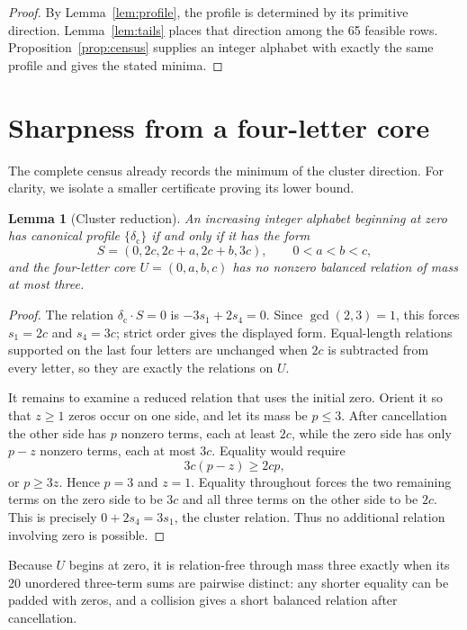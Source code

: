 \documentclass[11pt]{article}
\newtheorem{lemma}[theorem]{Lemma}
\theoremstyle{definition}
\begin{document}
\begin{proof}
By Lemma~\ref{lem:profile}, the profile is determined by its primitive
direction.  Lemma~\ref{lem:tails} places that direction among the 65 feasible
rows.  Proposition~\ref{prop:census} supplies an integer alphabet with
exactly the same profile and gives the stated minima.
\end{proof}

\section{Sharpness from a four-letter core}

The complete census already records the minimum of the cluster direction.
For clarity, we isolate a smaller certificate proving its lower bound.

\begin{lemma}[Cluster reduction]\label{lem:cluster}
An increasing integer alphabet beginning at zero has canonical profile
$\{\delta_{\mathrm c}\}$ if and only if it has the form
\[
 S=(0,2c,2c+a,2c+b,3c),\qquad 0<a<b<c,
\]
and the four-letter core $U=(0,a,b,c)$ has no nonzero balanced relation of
mass at most three.
\end{lemma}

\begin{proof}
The relation $\delta_{\mathrm c}\cdot S=0$ is
$-3s_1+2s_4=0$.  Since $\gcd(2,3)=1$, this forces $s_1=2c$ and $s_4=3c$;
strict order gives the displayed form.  Equal-length relations supported on
the last four letters are unchanged when $2c$ is subtracted from every
letter, so they are exactly the relations on $U$.

It remains to examine a reduced relation that uses the initial zero.  Orient
it so that $z\geq1$ zeros occur on one side, and let its mass be $p\leq3$.
After cancellation the other side has $p$ nonzero terms, each at least
$2c$, while the zero side has only $p-z$ nonzero terms, each at most $3c$.
Equality would require
\[
                         3c(p-z)\geq2cp,
\]
or $p\geq3z$.  Hence $p=3$ and $z=1$.  Equality throughout forces the two
remaining terms on the zero side to be $3c$ and all three terms on the other
side to be $2c$.  This is precisely $0+2s_4=3s_1$, the cluster relation.
Thus no additional relation involving zero is possible.
\end{proof}

Because $U$ begins at zero, it is relation-free through mass three exactly
when its 20 unordered three-term sums are pairwise distinct: any shorter
equality can be padded with zeros, and a collision gives a short balanced
relation after cancellation.
\end{document}
